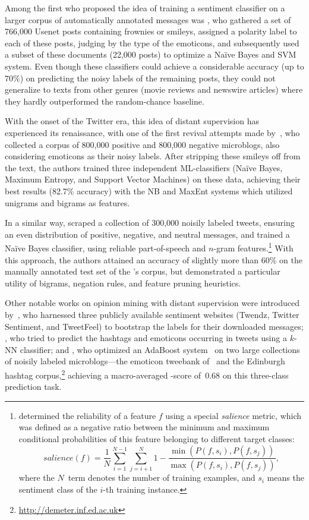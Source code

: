 Among the first who proposed the idea of training a sentiment
classifier on a larger corpus of automatically annotated messages was
\citet{Read:05}, who gathered a set of 766,000 Usenet posts containing
frownies or smileys, assigned a polarity label to each of these posts,
judging by the type of the emoticons, and subsequently used a subset
of these documents (22,000 posts) to optimize a Na{\"i}ve Bayes and
SVM system.  Even though these classifiers could achieve a
considerable accuracy (up to 70\%) on predicting the noisy labels of
the remaining posts, they could not generalize to texts from other
genres (movie reviews and newswire articles) where they hardly
outperformed the random-chance baseline.

With the onset of the Twitter era, this idea of distant supervision
has experienced its renaissance, with one of the first revival
attempts made by~\citet{Go:09}, who collected a corpus of 800,000
positive and 800,000 negative microblogs, also considering emoticons
as their noisy labels.  After stripping these smileys off from the
text, the authors trained three independent ML-classifiers (Na{\"i}ve
Bayes, Maximum Entropy, and Support Vector Machines) on these data,
achieving their best results (82.7\% accuracy) with the NB and MaxEnt
systems which utilized unigrams and bigrams as features.

In a similar way, \citet{Pak:10} scraped a collection of 300,000
noisily labeled tweets, ensuring an even distribution of positive,
negative, and neutral messages, and trained a Na{\"i}ve Bayes
classifier, using reliable part-of-speech and $n$-gram
features.\footnote{\citet{Pak:10} determined the reliability of a
  feature $f$ using a special \emph{salience} metric, which was
  defined as a negative ratio between the minimum and maximum
  conditional probabilities of this feature belonging to different
  target classes:
  \begin{equation*}
    salience(f) = \frac{1}{N}\sum_{i=1}^{N-1}\sum_{j=i+1}^N 1 - \frac{\min(P(f, s_i), P(f, s_j))}{\max(P(f, s_i), P(f, s_j))},
  \end{equation*}
  where the $N$~term denotes the number of training examples, and
  $s_i$ means the sentiment class of the $i$-th training instance.}
With this approach, the authors attained an accuracy of slightly more
than 60\% on the manually annotated test set of the
\citeauthor{Go:09}'s corpus, but demonstrated a particular utility of
bigrams, negation rules, and feature pruning heuristics.

Other notable works on opinion mining with distant supervision were
introduced by~\citet{Barbosa:10}, who harnessed three publicly
available sentiment websites (Twendz, Twitter Sentiment, and
TweetFeel) to bootstrap the labels for their downloaded messages;
\citet{Davidov:10}, who tried to predict the hashtags and emoticons
occurring in tweets using a $k$-NN classifier; and
\citet{Kouloumpis:11}, who optimized an AdaBoost
system~\cite{Schapire:00} on two large collections of noisily labeled
microblogs---the emoticon tweebank of~\citet{Go:09} and the Edinburgh
hashtag corpus,\footnote{\url{http://demeter.inf.ed.ac.uk}} achieving
a macro-averaged \F-score of~0.68 on this three-class prediction task.

